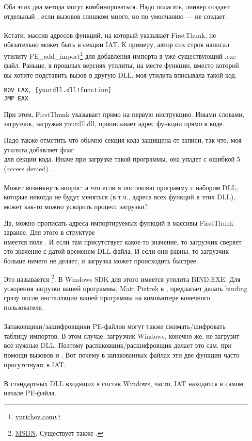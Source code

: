 Оба этих два метода могут комбинироваться.
Надо полагать, линкер создает отдельный , если вызовов слишком много, но по умолчанию --- не создает. \\
\\
Кстати, массив адресов функций, на который указывает FirstThunk,
не обязательно может быть в секции \ac{IAT}.
К примеру, автор сих строк написал утилиту
PE\_add\_import\footnote{\href{http://go.yurichev.com/17049}{yurichev.com}} 
для добавления импорта в уже существующий .exe-файл.
Раньше, в прошлых версиях утилиты, на месте функции, вместо которой вы хотите подставить вызов в другую DLL,
моя утилита вписывала такой код:

\begin{lstlisting}
MOV EAX, [yourdll.dll!function]
JMP EAX
\end{lstlisting}

При этом, FirstThunk указывает прямо на первую инструкцию.
Иными словами, загрузчик, загружая yourdll.dll, прописывает адрес функции  прямо в коде.

Надо также отметить что обычно секция кода защищена от записи, так что, моя утилита добавляет флаг \\
для секции кода. Иначе при загрузке такой программы, она упадет с ошибкой 5 (access denied). \\
\\
Может возникнуть вопрос: а что если я поставляю программу с набором DLL,
которые никогда не будут меняться (в т.ч., адреса всех функций в этих DLL), может как-то можно ускорить процесс загрузки?

Да, можно прописать адреса импортируемых функций в массивы FirstThunk заранее.
Для этого в структуре \\
 имеется поле .
И если там присутствует какое-то значение, то загрузчик сверяет это значение с датой-временем DLL-файла.
И если они равны, то загрузчик больше ничего не делает, и загрузка может происходить быстрее.

Это называется 
\footnote{\href{http://go.yurichev.com/17050}{MSDN}.
Существует также .}.
В Windows SDK для этого имеется утилита BIND.EXE.
Для ускорения загрузки вашей программы, 
Matt Pietrek в \PietrekPEURL, предлагает делать binding сразу после инсталляции
вашей программы на компьютере конечного пользователя. \\
\\
Запаковщики/зашифровщики PE-файлов могут также сжимать/шифровать таблицу импортов.
В этом случае, загрузчик Windows, конечно же, не загрузит все нужные DLL.
Поэтому распаковщик/расшифровщик делает это сам, при помощи вызовов  и .
Вот почему в запакованных файлах эти две функции часто присутствуют в \ac{IAT}. \\
\\
В стандартных DLL входящих в состав Windows, часто, \ac{IAT} находится в самом начале PE-файла.

